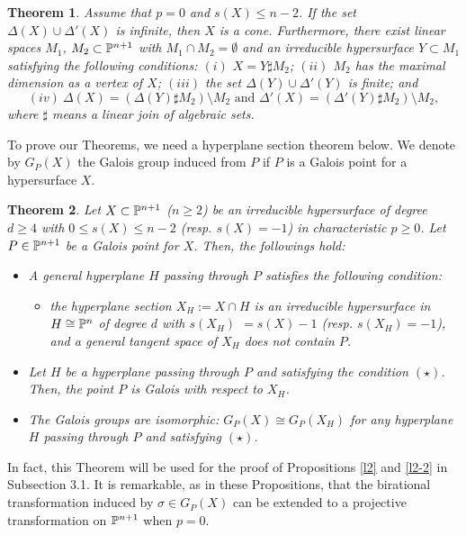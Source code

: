 \documentclass[10pt,oneside]{amsart}
\newtheorem{theorem}{Theorem}
\theoremstyle{definition}
\begin{document}
\begin{theorem} \label{InfiniteGalois}
Assume that $p=0$ and $s(X) \le n-2$. 
If the set $\Delta(X) \cup \Delta'(X)$ is infinite, then $X$ is a cone. 
Furthermore, there exist linear spaces $M_1$, $M_2 \subset \Bbb P^{n+1}$ with $M_1 \cap M_2=\emptyset$ and an irreducible hypersurface $Y \subset M_1$ satisfying the following conditions: 
$(i)$ $X=Y \sharp M_2$;
$(ii)$ $M_2$ has the maximal dimension as a vertex of $X$;
$(iii)$ the set $\Delta(Y) \cup \Delta'(Y)$ is finite; and 
$$ (iv) \ \Delta(X)=(\Delta(Y) \sharp M_2) \setminus M_2 \mbox{ and } \Delta'(X)=(\Delta'(Y) \sharp M_2) \setminus M_2, $$
where $\sharp$ means a linear join of algebraic sets. 
\end{theorem}

To prove our Theorems, we need a hyperplane section theorem below. 
We denote by $G_P(X)$ the Galois group induced from $P$ if $P$ is a Galois point for a hypersurface $X$.  

\begin{theorem} \label{HyperplaneSection}
Let $X \subset \Bbb P^{n+1}$ ($n \ge 2$) be an irreducible hypersurface of degree $d \ge 4$ with $0 \le s(X) \le n-2$ (resp. $s(X)=-1$) in characteristic $p \ge 0$. 
Let $P \in \Bbb P^{n+1}$ be a Galois point for $X$. 
Then, the followings hold: 
\begin{itemize}
\item[(i)] A general hyperplane $H$ passing through $P$ satisfies the following condition: 
\begin{itemize}
\item [$(\star)$] the hyperplane section $X_H:=X \cap H$ is an irreducible hypersurface in $H \cong \Bbb P^n$ of degree $d$ with $s(X_H)$ $=s(X)-1$ (resp. $s(X_H)=-1$), and a general tangent space of $X_H$ does not contain $P$.  
\end{itemize} 
\item[(ii)] Let $H$ be a hyperplane passing through $P$ and satisfying the condition $(\star)$. 
Then, the point $P$ is Galois with respect to $X_H$.  
\item[(iii)] The Galois groups are isomorphic: $G_P(X) \cong G_P(X_H)$ for any hyperplane $H$ passing through $P$ and satisfying $(\star)$. 
\end{itemize}   
\end{theorem} 

In fact, this Theorem will be used for the proof of Propositions \ref{l2} and \ref{l2-2} in Subsection 3.1. 
It is remarkable, as in these Propositions, that the birational transformation induced by $\sigma \in G_P(X)$ can be extended to a projective transformation on $\Bbb P^{n+1}$ when $p=0$.  
\end{document}
